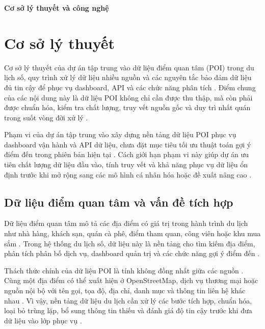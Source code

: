 \documentclass[12pt,a4paper]{article}
\begin{document}
\begin{center}
{\Large\bfseries Cơ sở lý thuyết và công nghệ}
\end{center}

\section{Cơ sở lý thuyết}

Cơ sở lý thuyết của dự án tập trung vào dữ liệu điểm quan tâm (POI) trong du lịch số, quy trình xử lý dữ liệu nhiều nguồn và các nguyên tắc bảo đảm dữ liệu đủ tin cậy để phục vụ dashboard, API và các chức năng phân tích \cite{zhang2023}. Điểm chung của các nội dung này là dữ liệu POI không chỉ cần được thu thập, mà còn phải được chuẩn hóa, kiểm tra chất lượng, truy vết nguồn gốc và duy trì nhất quán trong suốt vòng đời xử lý \cite{ibmDataQuality}.\par

Phạm vi của dự án tập trung vào xây dựng nền tảng dữ liệu POI phục vụ dashboard vận hành và API dữ liệu, chưa đặt mục tiêu tối ưu thuật toán gợi ý điểm đến trong phiên bản hiện tại \cite{zhang2023}. Cách giới hạn phạm vi này giúp dự án ưu tiên chất lượng dữ liệu đầu vào, tính truy vết và khả năng phục vụ dữ liệu ổn định trước khi mở rộng sang các mô hình cá nhân hóa hoặc đề xuất nâng cao \cite{ibmDataQuality}.\par

\subsection{Dữ liệu điểm quan tâm và vấn đề tích hợp}

Dữ liệu điểm quan tâm mô tả các địa điểm có giá trị trong hành trình du lịch như nhà hàng, khách sạn, quán cà phê, điểm tham quan, công viên hoặc khu mua sắm \cite{zhang2023}. Trong hệ thống du lịch số, dữ liệu này là nền tảng cho tìm kiếm địa điểm, phân tích phân bố dịch vụ, dashboard quản trị và các chức năng gợi ý điểm đến \cite{zhang2023}.\par

Thách thức chính của dữ liệu POI là tính không đồng nhất giữa các nguồn \cite{yeboah2021}. Cùng một địa điểm có thể xuất hiện ở OpenStreetMap, dịch vụ thương mại hoặc nguồn nội bộ với tên gọi, tọa độ, địa chỉ, danh mục và thông tin liên hệ khác nhau \cite{yeboah2021}. Vì vậy, nền tảng dữ liệu du lịch cần xử lý các bước tích hợp, chuẩn hóa, loại bỏ trùng lặp, bổ sung thông tin thiếu và đánh giá độ tin cậy trước khi đưa dữ liệu vào lớp phục vụ \cite{ibmDataQuality}.\par
\end{document}
